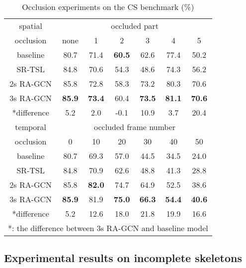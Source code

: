 \documentclass{article}
\begin{document}
\begin{table}
\label{tab:3}
\caption{Occlusion experiments on the CS benchmark (\%)}
\centering
\begin{tabular}{ccccccc}
\hline
spatial & \multicolumn{6}{c}{occluded part} \\
\cline{2-7}
occlusion & none & 1 & 2 & 3 & 4 & 5 \\
\hline
baseline \cite{Yan2018} & 80.7 & 71.4 & {\bf 60.5} & 62.6 & 77.4 & 50.2 \\
SR-TSL \cite{Si2018} & 84.8 & 70.6 & 54.3 & 48.6 & 74.3 & 56.2 \\
2s RA-GCN & 85.8 & 72.8 & 58.3 & 73.2 & 80.3 & 70.6 \\
3s RA-GCN & {\bf 85.9} & {\bf 73.4} & 60.4 & {\bf 73.5} & {\bf 81.1} & {\bf 70.6} \\
*difference & 5.2 & 2.0 & -0.1 & 10.9 & 3.7 & 20.4 \\
\hline
\hline
temporal & \multicolumn{6}{c}{occluded frame number} \\
\cline{2-7}
occlusion & 0 & 10 & 20 & 30 & 40 & 50 \\
\hline
baseline \cite{Yan2018} & 80.7 & 69.3 & 57.0 & 44.5 & 34.5 & 24.0 \\
SR-TSL \cite{Si2018} & 84.8 & 70.9 & 62.6 & 48.8 & 41.3 & 28.8 \\
2s RA-GCN & 85.8 & {\bf 82.0} & 74.7 & 64.9 & 52.5 & 38.6 \\
3s RA-GCN & {\bf 85.9} & 81.9 & {\bf 75.0} & {\bf 66.3} & {\bf 54.4} & {\bf 40.6} \\
*difference & 5.2 & 12.6 & 18.0 & 21.8 & 19.9 & 16.6 \\
\hline
\multicolumn{7}{l}{*: the difference between 3s RA-GCN and baseline model}
\end{tabular}
\end{table}

\subsection{Experimental results on incomplete skeletons}
\label{ssec:occlusion}
\end{document}
